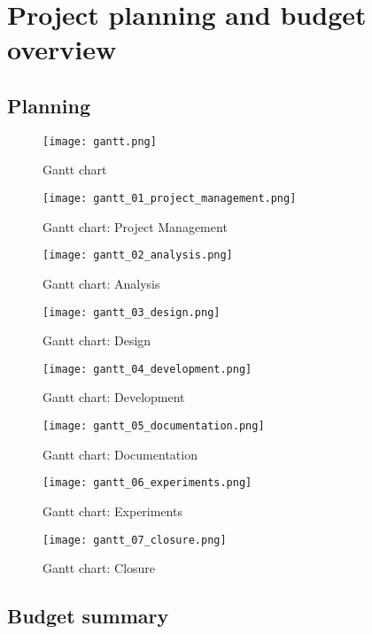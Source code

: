\renewcommand{\documentname}{Project planning and budget overview}

\chapter{Project planning and budget overview}


\section{Planning}

\begin{figure}[H]
    \caption{Gantt chart}
  \centering
  \texttt{[image: gantt.png]}
\end{figure}

\begin{figure}[H]
    \caption{Gantt chart: Project Management}
  \centering
  \texttt{[image: gantt\_01\_project\_management.png]}
\end{figure}

\begin{figure}[H]
    \caption{Gantt chart: Analysis}
  \centering
  \texttt{[image: gantt\_02\_analysis.png]}
\end{figure}

\begin{figure}[H]
    \caption{Gantt chart: Design}
  \centering
  \texttt{[image: gantt\_03\_design.png]}
\end{figure}

\begin{figure}[H]
    \caption{Gantt chart: Development}
  \centering
  \texttt{[image: gantt\_04\_development.png]}
\end{figure}

\begin{figure}[H]
    \caption{Gantt chart: Documentation}
  \centering
  \texttt{[image: gantt\_05\_documentation.png]}
\end{figure}

\begin{figure}[H]
    \caption{Gantt chart: Experiments}
  \centering
  \texttt{[image: gantt\_06\_experiments.png]}
\end{figure}

\begin{figure}[H]
    \caption{Gantt chart: Closure}
  \centering
  \texttt{[image: gantt\_07\_closure.png]}
\end{figure}


\section{Budget summary}

